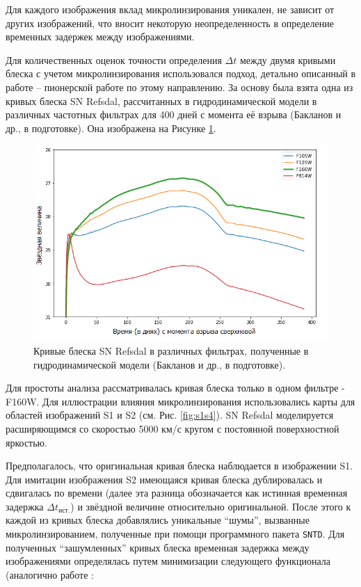 Для каждого изображения вклад микролинзирования уникален, не зависит от других изображений, что вносит некоторую неопределенность в определение временных задержек между изображениями. 

Для количественных оценок точности определения $\Delta t$ между двумя кривыми блеска с учетом микролинзирования использовался подход, детально описанный в работе \cite{doblerkeeton2006} -- пионерской работе по этому направлению. За основу была взята одна из кривых блеска SN Refsdal, рассчитанных в гидродинамической модели в различных частотных фильтрах для 400 дней с момента её взрыва (Бакланов и др., в подготовке). Она изображена на Рисунке \ref{fig:lightcurves}. 

\begin{figure}[H]
    \centering
	\includegraphics[scale=0.72]{pics/lightcurves.png}
	\caption{Кривые блеска SN Refsdal в различных фильтрах, полученные в гидродинамической модели (Бакланов и др., в подготовке). \label{fig:lightcurves}} 
\end{figure}

Для простоты анализа рассматривалась кривая блеска только в одном фильтре - F160W. Для иллюстрации влияния микролинзирования использовались карты для областей изображений S1 и S2 (см. Рис. \ref{fig:s1s4}). SN Refsdal моделируется расширяющимся со скоростью 5000 км/с кругом с постоянной поверхностной яркостью.

Предполагалось, что оригинальная кривая блеска наблюдается в изображении S1. Для имитации изображения S2 имеющаяся кривая блеска дублировалась и сдвигалась по времени (далее эта разница обозначается как истинная временная задержка $\Delta t_{\textrm{ист.}}$) и звёздной величине относительно оригинальной. После этого к каждой из кривых блеска добавлялись уникальные “шумы”, вызванные микролинзированием, полученные при помощи программного пакета {\tt{SNTD}}. Для полученных “зашумленных” кривых блеска временная задержка между изображениями определялась путем минимизации следующего функционала (аналогично работе \cite{doblerkeeton2006}:


